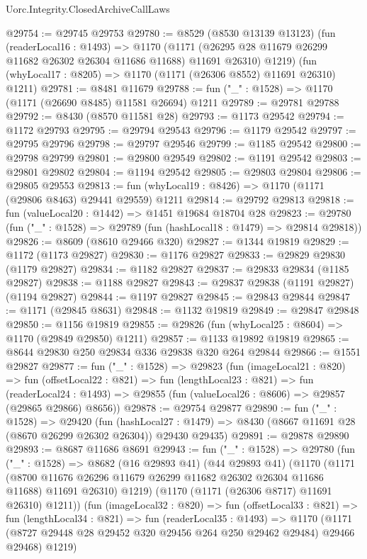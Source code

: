 \begin{lexlean}{Uorc.Integrity.ClosedArchiveCallLaws}
\begin{coremodule}
@29754 := @29745 @29753
@29780 := @8529
    (@8530 @13139 @13123)
    (fun (readerLocal16 : @1493) =>
    @1170 (@1171 (@26295 @28 @11679 @26299 @11682 @26302 @26304 @11686 @11688) @11691 @26310) @1219)
    (fun (whyLocal17 : @8205) => @1170 (@1171 (@26306 @8552) @11691 @26310) @1211)
@29781 := @8481 @11679
@29788 := fun ("_" : @1528) => @1170 (@1171 (@26690 @8485) @11581 @26694) @1211
@29789 := @29781 @29788
@29792 := @8430 (@8570 @11581 @28)
@29793 := @1173 @29542
@29794 := @1172 @29793
@29795 := @29794 @29543
@29796 := @1179 @29542
@29797 := @29795 @29796
@29798 := @29797 @29546
@29799 := @1185 @29542
@29800 := @29798 @29799
@29801 := @29800 @29549
@29802 := @1191 @29542
@29803 := @29801 @29802
@29804 := @1194 @29542
@29805 := @29803 @29804
@29806 := @29805 @29553
@29813 := fun (whyLocal19 : @8426) => @1170 (@1171 (@29806 @8463) @29441 @29559) @1211
@29814 := @29792 @29813
@29818 := fun (valueLocal20 : @1442) => @1451 @19684 @18704 @28
@29823 := @29780 (fun ("_" : @1528) => @29789 (fun (hashLocal18 : @1479) => @29814 @29818))
@29826 := @8609 (@8610 @29466 @320)
@29827 := @1344 @19819
@29829 := @1172 (@1173 @29827)
@29830 := @1176 @29827
@29833 := @29829 @29830 (@1179 @29827)
@29834 := @1182 @29827
@29837 := @29833 @29834 (@1185 @29827)
@29838 := @1188 @29827
@29843 := @29837 @29838 (@1191 @29827) (@1194 @29827)
@29844 := @1197 @29827
@29845 := @29843 @29844
@29847 := @1171 (@29845 @8631)
@29848 := @1132 @19819
@29849 := @29847 @29848
@29850 := @1156 @19819
@29855 := @29826 (fun (whyLocal25 : @8604) => @1170 (@29849 @29850) @1211)
@29857 := @1133 @19892 @19819
@29865 := @8644 @29830 @250 @29834 @336 @29838 @320 @264 @29844
@29866 := @1551 @29827
@29877 := fun ("_" : @1528) =>
  @29823
    (fun (imageLocal21 : @820) =>
    fun (offsetLocal22 : @821) =>
    fun (lengthLocal23 : @821) =>
    fun (readerLocal24 : @1493) =>
    @29855 (fun (valueLocal26 : @8606) => @29857 (@29865 @29866) @8656))
@29878 := @29754 @29877
@29890 := fun ("_" : @1528) =>
  @29420
    (fun (hashLocal27 : @1479) =>
    @8430 (@8667 @11691 @28 (@8670 @26299 @26302 @26304)) @29430 @29435)
@29891 := @29878 @29890
@29893 := @8687 @11686 @8691
@29943 := fun ("_" : @1528) =>
  @29780
    (fun ("_" : @1528) =>
    @8682
      (@16 @29893 @41)
      (@44 @29893 @41)
      (@1170
        (@1171 (@8700 @11676 @26296 @11679 @26299 @11682 @26302 @26304 @11686 @11688) @11691 @26310)
        @1219)
      (@1170 (@1171 (@26306 @8717) @11691 @26310) @1211))
    (fun (imageLocal32 : @820) =>
    fun (offsetLocal33 : @821) =>
    fun (lengthLocal34 : @821) =>
    fun (readerLocal35 : @1493) =>
    @1170 (@1171 (@8727 @29448 @28 @29452 @320 @29456 @264 @250 @29462 @29484) @29466 @29468) @1219)

\end{coremodule}
\end{lexlean}
